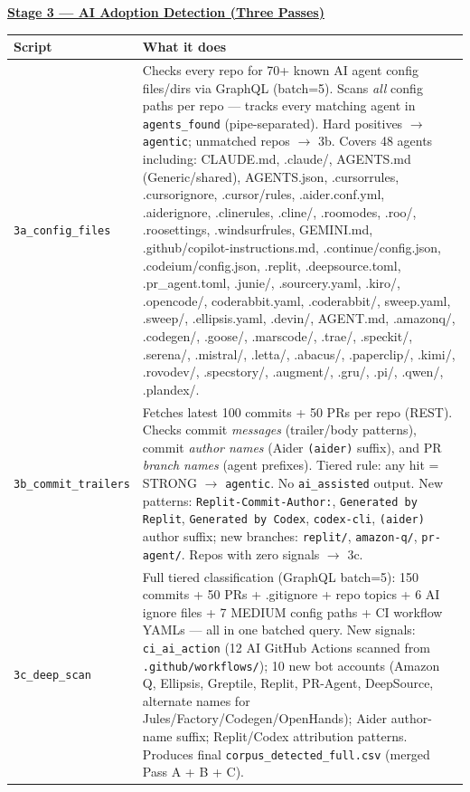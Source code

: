 \documentclass[9pt,a4paper]{article}
\begin{document}
\vspace{5pt}
\noindent\textbf{\underline{Stage 3 --- AI Adoption Detection (Three Passes)}}

\begin{tabular}{@{}lp{14cm}@{}}
\toprule
Script & What it does \\
\midrule
\cellcolor{stagegray}\texttt{3a\_config\_files} &
  Checks every repo for 70+ known AI agent config files/dirs via GraphQL (batch=5).
  Scans \emph{all} config paths per repo --- tracks every matching agent in
  \texttt{agents\_found} (pipe-separated). Hard positives $\to$ \texttt{agentic};
  unmatched repos $\to$ 3b.
  Covers 48 agents including: CLAUDE.md, .claude/, AGENTS.md (Generic/shared),
  AGENTS.json, .cursorrules, .cursorignore, .cursor/rules, .aider.conf.yml,
  .aiderignore, .clinerules, .cline/, .roomodes, .roo/, .roosettings,
  .windsurfrules, GEMINI.md, .github/copilot-instructions.md,
  .continue/config.json, .codeium/config.json, .replit, .deepsource.toml,
  .pr\_agent.toml, .junie/, .sourcery.yaml, .kiro/, .opencode/, coderabbit.yaml,
  .coderabbit/, sweep.yaml, .sweep/, .ellipsis.yaml, .devin/, AGENT.md,
  .amazonq/, .codegen/, .goose/, .marscode/, .trae/, .speckit/, .serena/,
  .mistral/, .letta/, .abacus/, .paperclip/, .kimi/, .rovodev/, .specstory/,
  .augment/, .gru/, .pi/, .qwen/, .plandex/. \\[2pt]
\cellcolor{stagegray}\texttt{3b\_commit\_trailers} &
  Fetches latest 100 commits + 50 PRs per repo (REST).
  Checks commit \emph{messages} (trailer/body patterns), commit \emph{author names}
  (Aider \texttt{(aider)} suffix), and PR \emph{branch names} (agent prefixes).
  Tiered rule: any hit = STRONG $\to$ \texttt{agentic}. No \texttt{ai\_assisted} output.
  New patterns: \texttt{Replit-Commit-Author:}, \texttt{Generated by Replit},
  \texttt{Generated by Codex}, \texttt{codex-cli}, \texttt{(aider)} author suffix;
  new branches: \texttt{replit/}, \texttt{amazon-q/}, \texttt{pr-agent/}.
  Repos with zero signals $\to$ 3c. \\[2pt]
\cellcolor{stagegray}\texttt{3c\_deep\_scan} &
  Full tiered classification (GraphQL batch=5): 150 commits + 50 PRs + .gitignore
  + repo topics + 6 AI ignore files + 7 MEDIUM config paths + CI workflow YAMLs
  --- all in one batched query.
  New signals: \texttt{ci\_ai\_action} (12 AI GitHub Actions scanned from
  \texttt{.github/workflows/}); 10 new bot accounts (Amazon Q, Ellipsis, Greptile,
  Replit, PR-Agent, DeepSource, alternate names for Jules/Factory/Codegen/OpenHands);
  Aider author-name suffix; Replit/Codex attribution patterns.
  Produces final \texttt{corpus\_detected\_full.csv} (merged Pass A + B + C). \\
\bottomrule
\end{tabular}
\end{document}
